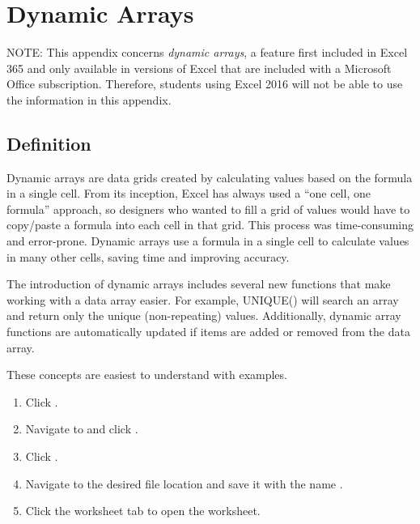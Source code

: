 \chapter{Dynamic Arrays}\label{app02:dynamic}

 NOTE: This appendix concerns \textit{dynamic arrays}, a feature first included in Excel 365 and only available in versions of Excel that are included with a Microsoft Office subscription. Therefore, students using Excel 2016 will not be able to use the information in this appendix.

\section{Definition}

Dynamic arrays are data grids created by calculating values based on the formula in a single cell. From its inception, Excel has always used a ``one cell, one formula'' approach, so designers who wanted to fill a grid of values would have to copy/paste a formula into each cell in that grid. This process was time-consuming and error-prone. Dynamic arrays use a formula in a single cell to calculate values in many other cells, saving time and improving accuracy.

The introduction of dynamic arrays includes several new functions that make working with a data array easier. For example, UNIQUE() will search an array and return only the unique (non-repeating) values. Additionally, dynamic array functions are automatically updated if items are added or removed from the data array.

These concepts are easiest to understand with examples.

\begin{enumbox}
	\begin{enumerate}
		\item Click .
		\item Navigate to  and click .
		\item Click .
		\item Navigate to the desired file location and save it with the name .
		\item Click the  worksheet tab to open the worksheet.
	\end{enumerate}
\end{enumbox}

